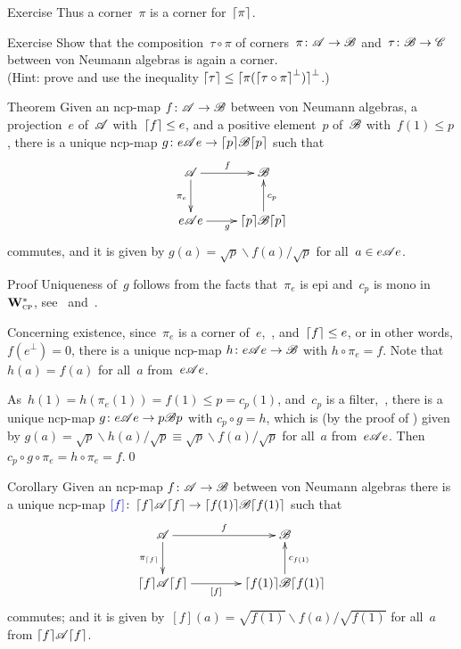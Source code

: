 \documentclass[a]{subfiles}
\begin{document}
\begin{parsec}
\begin{point}{Exercise}
Thus a corner~$\pi$ is a corner for~$\left\lceil\pi\right\rceil$.
\end{point}
\begin{point}{Exercise}%
Show that the composition~$\tau\circ \pi$
of corners~$\pi\colon \mathscr{A}\to\mathscr{B}$
and~$\tau\colon \mathscr{B}\to\mathscr{C}$
between von Neumann algebras
is again a corner.\\
(Hint:
prove
and use the inequality
$\left\lceil\tau\right\rceil\leq \left\lceil\smash{\pi(\left\lceil\tau\circ \pi\right\rceil^\perp)}\right\rceil^\perp$.)
\end{point}
\begin{point}{Theorem}%
Given an ncp-map $f\colon\mathscr{A}\to\mathscr{B}$
between von Neumann algebras,
a projection~$e$ of~$\mathscr{A}$
with~$\left\lceil f\right\rceil\leq e$,
and a positive element~$p$
of~$\mathscr{B}$ with~$f(1) \leq p$,
there is a unique ncp-map
$g \colon e\mathscr{A} e
\to \left\lceil p\right\rceil\!\mathscr{B}\!\left\lceil p\right\rceil$
such that
\begin{equation*}
\xymatrix{
\scrA
\ar[r]^-f
\ar[d]_{\pi_e}
&
\scrB
\\
e\scrA e
\ar[r]_g
& 
\ceil{p}\!\scrB\!\ceil{p}
\ar[u]_{c_p}
}
\end{equation*}
commutes,
and it is given by
$g(a)=\sqrt{p}\backslash f(a)/\!\sqrt{p}$
for all~$a\in e\mathscr{A} e$.
\begin{point}{Proof}%
Uniqueness of~$g$ follows from the facts
that~$\pi_e$ is epi and~$c_p$ is mono
in~$\mathbf{W}^*_{\text{\textsc{cp}}}$,
see~ and~.

Concerning existence, 
since~$\pi_e$ is a corner of~$e$,~,
and~$\left\lceil f\right\rceil\leq e$,
or in other words, $f(e^\perp)=0$,
there is a unique ncp-map $h\colon e\mathscr{A} e\to \mathscr{B}$
with $h \circ \pi_e = f$.
Note that~$h(a)=f(a)$ for all~$a$ from~$e\mathscr{A} e$.

As~$h(1)=h(\pi_e(1))=f(1)\leq p=c_p(1)$,
and~$c_p$ is a filter,~,
there is a unique ncp-map
$g\colon e\mathscr{A} e \to p \mathscr{B} p$
with $c_p\circ g = h$,
which is (by the proof of ) given by
$g(a)=\sqrt{p}\backslash h(a)/\sqrt{p}
\equiv \sqrt{p}\backslash f(a)/\sqrt{p}$
for all~$a$ from~$e\mathscr{A} e$.
Then~$c_p\circ g\circ \pi_e = h\circ \pi_e = f$.\qed
\end{point}
\end{point}
\begin{point}[square-f]{Corollary}%
Given an ncp-map $f\colon \mathscr{A}\to\mathscr{B}$
between von Neumann algebras
there is a unique ncp-map $\Define{[f]}\colon 
\ceil{f}\!\scrA\!\ceil{f}
\to
\ceil{f(1)}\!\scrB\!\ceil{f(1)}$
such that 
\begin{equation*}
\xymatrix@C=4em{
\scrA
\ar[r]^-f
\ar[d]_{\pi_{\ceil{f}}}
&
\scrB
\\
\ceil{f}\!\scrA\!\ceil{f}
\ar[r]_-{[f]}
& 
\ceil{f(1)}\!\scrB\!\ceil{f(1)}
\ar[u]_{c_{f(1)}}
}
\end{equation*}
commutes;
and it is given by~$[f](a)=\sqrt{f(1)}\backslash f(a)/\!\sqrt{f(1)}$
for all~$a$ from $\left\lceil f\right\rceil\!\mathscr{A}\!\left\lceil f\right\rceil$.


\end{point}
\end{parsec}
\end{document}
